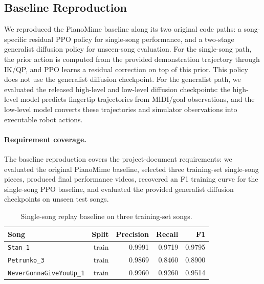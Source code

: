 
\subsection{Baseline Reproduction}
\label{sec:baseline-reproduction}

We reproduced the PianoMime baseline along its two original code paths: a
song-specific residual PPO policy for single-song performance, and a two-stage
generalist diffusion policy for unseen-song evaluation. For the single-song
path, the prior action is computed from the provided demonstration trajectory
through IK/QP, and PPO learns a residual correction on top of this prior. This
policy does not use the generalist diffusion checkpoint. For the generalist
path, we evaluated the released high-level and low-level diffusion checkpoints:
the high-level model predicts fingertip trajectories from MIDI/goal
observations, and the low-level model converts these trajectories and simulator
observations into executable robot actions.

\paragraph{Requirement coverage.}
The baseline reproduction covers the project-document requirements: we
evaluated the original PianoMime baseline, selected three training-set
single-song pieces, produced final performance videos, recovered an F1 training
curve for the single-song PPO baseline, and evaluated the provided generalist
diffusion checkpoints on unseen test songs.

\begin{table}[h]
\centering
\caption{Single-song replay baseline on three training-set songs.}
\label{tab:single-song-baseline}
\begin{tabular}{lrrrr}
\toprule
Song & Split & Precision & Recall & F1 \\
\midrule
\texttt{Stan\_1} & train & 0.9991 & 0.9719 & 0.9795 \\
\texttt{Petrunko\_3} & train & 0.9869 & 0.8460 & 0.8900 \\
\texttt{NeverGonnaGiveYouUp\_1} & train & 0.9960 & 0.9260 & 0.9514 \\
\bottomrule
\end{tabular}
\end{table}

